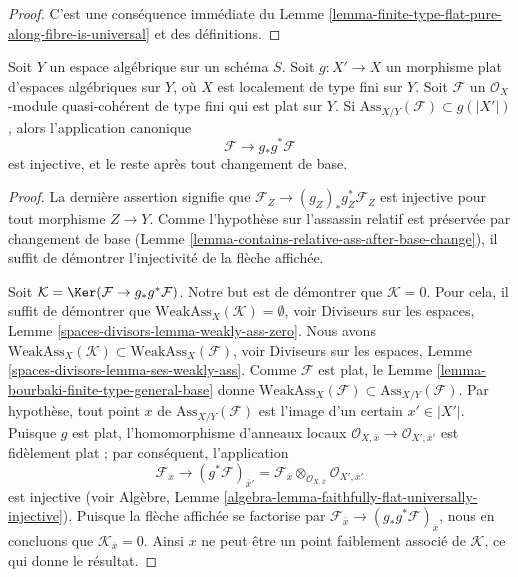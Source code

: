 \begin{proof}
C'est une conséquence immédiate du
Lemme \ref{lemma-finite-type-flat-pure-along-fibre-is-universal}
et des définitions.
\end{proof}

\begin{lemma}
\label{lemma-universally-separating}
Soit $Y$ un espace algébrique sur un schéma $S$.
Soit $g : X' \to X$ un morphisme plat d'espaces algébriques sur $Y$,
où $X$ est localement de type fini sur $Y$.
Soit $\mathcal{F}$ un $\mathcal{O}_X$-module quasi-cohérent de type fini
qui est plat sur $Y$. Si $\text{Ass}_{X/Y}(\mathcal{F}) \subset g(|X'|)$,
alors l'application canonique
$$
\mathcal{F} \longrightarrow g_*g^*\mathcal{F}
$$
est injective, et le reste après tout changement de base.
\end{lemma}

\begin{proof}
La dernière assertion signifie que $\mathcal{F}_Z \to (g_Z)_*g_Z^*\mathcal{F}_Z$
est injective pour tout morphisme $Z \to Y$. Comme l'hypothèse sur
l'assassin relatif est préservée par changement de base
(Lemme \ref{lemma-contains-relative-ass-after-base-change}),
il suffit de démontrer l'injectivité de la flèche affichée.

\medskip\noindent
Soit $\mathcal{K} = \Ker(\mathcal{F} \to g_*g^*\mathcal{F})$.
Notre but est de démontrer que $\mathcal{K} = 0$.
Pour cela, il suffit de démontrer que
$\text{WeakAss}_X(\mathcal{K}) = \emptyset$, voir
Diviseurs sur les espaces, Lemme \ref{spaces-divisors-lemma-weakly-ass-zero}.
Nous avons
$\text{WeakAss}_X(\mathcal{K}) \subset \text{WeakAss}_X(\mathcal{F})$, voir
Diviseurs sur les espaces, Lemme \ref{spaces-divisors-lemma-ses-weakly-ass}.
Comme $\mathcal{F}$ est plat, le
Lemme \ref{lemma-bourbaki-finite-type-general-base}
donne $\text{WeakAss}_X(\mathcal{F}) \subset \text{Ass}_{X/Y}(\mathcal{F})$.
Par hypothèse, tout point $x$ de $\text{Ass}_{X/Y}(\mathcal{F})$
est l'image d'un certain $x' \in |X'|$. Puisque $g$ est plat, l'homomorphisme
d'anneaux locaux
$\mathcal{O}_{X, \overline{x}} \to \mathcal{O}_{X', \overline{x}'}$
est fidèlement plat ; par conséquent, l'application
$$
\mathcal{F}_{\overline{x}}
\longrightarrow
(g^*\mathcal{F})_{\overline{x}'} =
\mathcal{F}_{\overline{x}} \otimes_{\mathcal{O}_{X, \overline{x}}}
\mathcal{O}_{X', \overline{x}'}
$$
est injective (voir
Algèbre, Lemme \ref{algebra-lemma-faithfully-flat-universally-injective}).
Puisque la flèche affichée se factorise par
$\mathcal{F}_{\overline{x}} \to (g_*g^*\mathcal{F})_{\overline{x}}$,
nous en concluons que
$\mathcal{K}_{\overline{x}} = 0$. Ainsi $x$ ne peut être un point faiblement
associé de $\mathcal{K}$, ce qui donne le résultat.
\end{proof}









